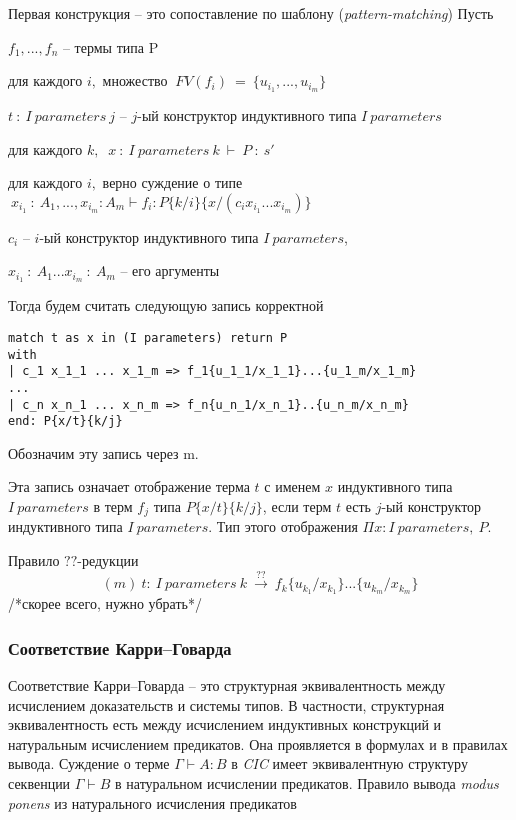 \documentclass[12pt]{article}
\begin{document}
Первая конструкция -- это сопоставление по шаблону
(\textit{pattern-matching})
Пусть 

    $f_1,...,f_n$ -- термы типа P
    
    для каждого $i,$ множество $\ FV(f_i)\ =\ \{u_{i_1}, ... , u_{i_m}\}$
    
    $t\ :\ I\ parameters\ j$ -- $j$-ый конструктор индуктивного типа $I\ parameters$
    
    для каждого $k,$ $\ x\ :\ I\ parameters\ k\ \vdash\ P\ :\ s′$
    
    для каждого $i,$ верно суждение о типе $\ x_{i_1}\ :\ A_1,..., x_{i_m} : A_m \vdash f_i : P\{k/i\}\{x/(c_i x_{i_1} ...x_{i_m})\}$
    
    $c_i$ -- $i$-ый конструктор индуктивного типа $I\ parameters$,
    
    $x_{i_1}\ :\ A_1 ... x_{i_m}\ :\ A_m$ -- его аргументы
    

\newpage
Тогда будем считать следующую запись корректной
\begin{verbatim}
match t as x in (I parameters) return P  
with
| c_1 x_1_1 ... x_1_m => f_1{u_1_1/x_1_1}...{u_1_m/x_1_m} 
...
| c_n x_n_1 ... x_n_m => f_n{u_n_1/x_n_1}..{u_n_m/x_n_m}
end: P{x/t}{k/j}
\end{verbatim}
 


Обозначим эту запись через m.


Эта запись означает отображение терма $t$ с именем $x$
индуктивного типа $I\ parameters$ в терм $f_j$ типа $P\{x/t\}\{k/j\}$, 
если терм $t$ есть $j$-ый конструктор индуктивного типа $I\ parameters$.
Тип этого отображения $\Pi x:I\ parameters,\ P$.

Правило $??$-редукции 
$$(m)\ t:\ I\ parameters\ k\  \xrightarrow{??}\ f_k\{u_{k_1}/x_{k_1}\}...\{u_{k_m}/x_{k_m}\}$$
/*скорее всего, нужно убрать*/










\subsubsection{Соответствие Карри--Говарда}
Соответствие Карри--Говарда -- это структурная эквивалентность между исчислением доказательств и системы типов. В частности, структурная эквивалентность есть между исчислением индуктивных конструкций и натуральным исчислением предикатов. Она проявляется в формулах и в правилах вывода. Суждение о терме $\Gamma \vdash A:B$ в \textit{CIC} имеет эквивалентную структуру секвенции $\Gamma \vdash B$ в натуральном исчислении предикатов. Правило вывода \textit{modus ponens} из натурального исчисления предикатов 
\end{document}
